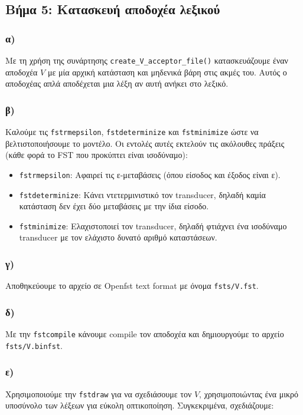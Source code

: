 \documentclass[a4paper, 12pt]{article}
\begin{document}
			    
    \subsection*{Βήμα 5: Κατασκευή αποδοχέα λεξικού}
        \subsubsection*{α)}
        	Με τη χρήση της συνάρτησης \verb|create_V_acceptor_file()| κατασκευάζουμε έναν αποδοχέα $V$ με μία αρχική κατάσταση και μηδενικά βάρη στις ακμές του. Αυτός ο αποδοχέας απλά αποδέχεται μια λέξη αν αυτή ανήκει στο λεξικό.
        	 
        \subsubsection*{β)}
        	Καλούμε τις \verb|fstrmepsilon|, \verb|fstdeterminize| και \verb|fstminimize| ώστε να βελτιστοποιήσουμε το μοντέλο. Οι εντολές αυτές εκτελούν τις ακόλουθες πράξεις (κάθε φορά το FST που προκύπτει είναι ισοδύναμο):
        	
        	\begin{itemize}
        		\item \verb|fstrmepsilon|: Αφαιρεί τις ε-μεταβάσεις (όπου είσοδος και έξοδος είναι ε). 
        		\item \verb|fstdeterminize|: Κάνει ντετερμινιστικό τον transducer, δηλαδή καμία κατάσταση δεν έχει δύο μεταβάσεις με την ίδια είσοδο.
        		\item \verb|fstminimize|: Ελαχιστοποιεί τον transducer, δηλαδή φτιάχνει ένα ισοδύναμο transducer με τον ελάχιστο δυνατό αριθμό καταστάσεων.
        	\end{itemize}
        	
        \subsubsection*{γ)}
        	Αποθηκεύουμε το αρχείο σε Openfst text format με όνομα \verb|fsts/V.fst|.
        	
        \subsubsection*{δ)}
        	Με την \verb|fstcompile| κάνουμε compile τον αποδοχέα και δημιουργούμε το αρχείο \verb|fsts/V.binfst|.
        	
        \subsubsection*{ε)}
        	Χρησιμοποιούμε την \verb|fstdraw| για να σχεδιάσουμε τον $V$, χρησιμοποιώντας ένα μικρό υποσύνολο των λέξεων για εύκολη οπτικοποίηση. Συγκεκριμένα, σχεδιάζουμε:
        	
\end{document}

